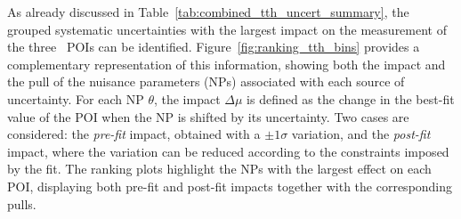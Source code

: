 As already discussed in Table~\ref{tab:combined_tth_uncert_summary}, the grouped systematic uncertainties with the largest impact on the measurement of the three \ttH\ POIs can be identified. 
Figure~\ref{fig:ranking_tth_bins} provides a complementary representation of this information, showing both the impact and the pull of the nuisance parameters (NPs) associated with each source of uncertainty. 
For each NP $\theta$, the impact $\Delta\mu$ is defined as the change in the best-fit value of the POI when the NP is shifted by its uncertainty. 
Two cases are considered: the \textit{pre-fit} impact, obtained with a $\pm 1\sigma$ variation, and the \textit{post-fit} impact, where the variation can be reduced according to the constraints imposed by the fit. 
The ranking plots highlight the NPs with the largest effect on each POI, displaying both pre-fit and post-fit impacts together with the corresponding pulls.
